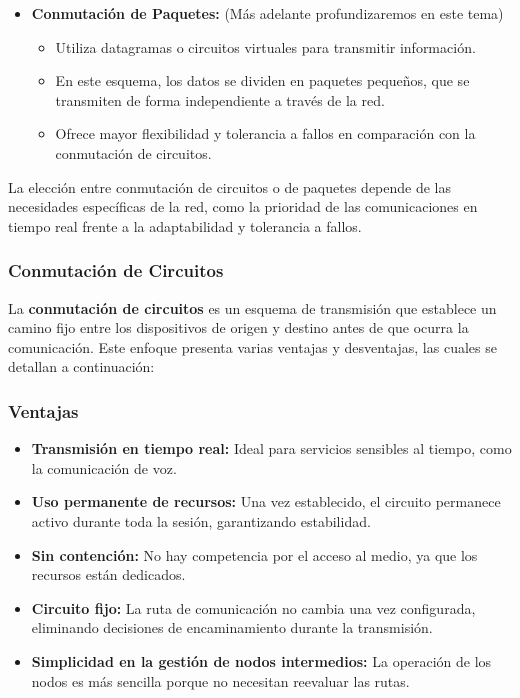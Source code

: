 \documentclass[a4paper,12pt]{article}
\begin{document}
\begin{itemize}
    \item \textbf{Conmutación de Paquetes:} (Más adelante profundizaremos en este tema)
    \begin{itemize}
        \item Utiliza datagramas o circuitos virtuales para transmitir información.
        \item En este esquema, los datos se dividen en paquetes pequeños, que se transmiten de forma independiente a través de la red.
        \item Ofrece mayor flexibilidad y tolerancia a fallos en comparación con la conmutación de circuitos.
    \end{itemize}
\end{itemize}

La elección entre conmutación de circuitos o de paquetes depende de las necesidades específicas de la red, como la prioridad de las comunicaciones en tiempo real frente a la adaptabilidad y tolerancia a fallos.

\subsubsection{Conmutación de Circuitos} 

La \textbf{conmutación de circuitos} es un esquema de transmisión que establece un camino fijo entre los dispositivos de origen y destino antes de que ocurra la comunicación. Este enfoque presenta varias ventajas y desventajas, las cuales se detallan a continuación:

\subsubsection*{Ventajas}

\begin{itemize}
    \item \textbf{Transmisión en tiempo real:} Ideal para servicios sensibles al tiempo, como la comunicación de voz.
    \item \textbf{Uso permanente de recursos:} Una vez establecido, el circuito permanece activo durante toda la sesión, garantizando estabilidad.
    \item \textbf{Sin contención:} No hay competencia por el acceso al medio, ya que los recursos están dedicados.
    \item \textbf{Circuito fijo:} La ruta de comunicación no cambia una vez configurada, eliminando decisiones de encaminamiento durante la transmisión.
    \item \textbf{Simplicidad en la gestión de nodos intermedios:} La operación de los nodos es más sencilla porque no necesitan reevaluar las rutas.
\end{itemize}
\end{document}
